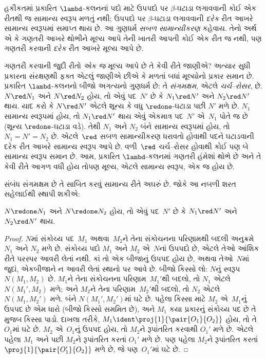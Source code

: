 હકીકતમાં પ્રકારિત $\lambd$-કલનનાં પદો માટે
ઉપપદો પર $\beta$-ઘટાડા લગાવવાની કોઈ એક
રીતથી જ સામાન્ય સ્વરૂપ મળતું નથી; ઉપપદો
પર $\beta$-ઘટાડા લગાવવાની \emph{દરેક}
રીત આખરે સામાન્ય સ્વરૂપમાં સમાપ્ત થાય છે.
આ ગુણધર્મ \emph{સબળ સામાન્યીકરણ} કહેવાય.
તેનો અર્થ એ કે ગણતરી આખરે થોભીને મૂલ્ય
આપે તેની ખાતરી આપતી કોઈ એક રીત જ નથી,
પણ ગણતરી કરવાની \emph{દરેક} રીત
આખરે મૂલ્ય આપે છે.

ગણતરી કરવાની જુદી રીતો \emph{એક જ} મૂલ્ય
આપે છે તે કેવી રીતે જાણીએ? અત્યાર સુધી
પ્રકારના સંરક્ષણથી ફક્ત એટલું જાણીએ છીએ
કે મળતાં બધાં મૂલ્યોનો પ્રકાર સમાન છે.
પ્રકારિત $\lambd$-કલનનો બીજો અગત્યનો
ગુણધર્મ છે: તે \emph{સંગમક્ષમ}, એટલે
\emph{ચર્ચ--રોસર}, છે.
$N \red N_1$ અને $N \red N_2$ હોય,
તો એવું પદ~$N'$ છે કે $N_1 \red N'$
અને $N_2 \red N'$ થાય. યાદ કરો કે
$N \red N'$ એટલે શૂન્ય કે વધુ
$\redone$-ઘટાડા પછી $N'$ મળે છે.
$N_1$ સામાન્ય સ્વરૂપમાં હોય, તો
$N_1 \red N'$ થાય એવું એકમાત્ર પદ~$N'$
એ~$N_1$ પોતે જ છે (શૂન્ય
$\redone$-ઘટાડા વડે). તેથી $N_1$ અને
$N_2$ બંને સામાન્ય સ્વરૂપમાં હોય, તો
$N_1 = N' = N_2$ છે. એટલે~$\red$
સબળ સામાન્યીકરણ ધરાવતો હોવાથી પદને
ઘટાડવાની દરેક રીત આખરે સામાન્ય સ્વરૂપ આપે છે.
વળી~$\red$ ચર્ચ--રોસર હોવાથી કોઈ પણ
બે સામાન્ય સ્વરૂપ સમાન છે. આમ, પ્રકારિત
$\lambd$-કલનમાં ગણતરી હંમેશાં થોભે છે
અને તે કેવી રીતે આગળ વધી હોય તોપણ
મૂલ્ય, એટલે સામાન્ય સ્વરૂપ, એક જ હોય છે.

સંબંધ સંગમક્ષમ છે તે સાબિત કરવું સામાન્ય રીતે
અઘરું છે. જોકે આ નબળી શરત સહેલાઈથી
સ્થાપી શકીએ:

\begin{prop}
$N \redone N_1$ અને $N \redone N_2$ હોય,
તો એવું પદ~$N'$ છે કે $N_1 \red N'$
અને $N_2 \red N'$ થાય.
\end{prop}

\begin{proof}
  $N$માં સંકોચ્ય પદ~$M_1$ અથવા~$M_2$ને
  તેના સંકોચનના પરિણામથી બદલી અનુક્રમે
  $N_1$ અને $N_2$ મળે છે. સંકોચ્ય પદો
  $M_1$ અને $M_2$ એ~$N$નાં ઉપપદો છે,
  એટલે તેઓ આંશિક રીતે પરસ્પર આવરી લેતાં નથી.
  કાં તો એક બીજાનું ઉપપદ હોય છે, અથવા
  તેઓ~$N$માં જુદાં, એકબીજાને ન આવરી લેતાં
  સ્થાનો પર આવે છે. બીજો કિસ્સો લો:
  $N$નું સ્વરૂપ $N(M_1,M_2)$ છે.
  $M_1$ને તેના સંકોચનના પરિણામ~$M_1'$થી
  બદલો, તો $N_1$ એટલે $N(M_1',M_2)$
  મળે; અને $M_2$ને તેના પરિણામ~$M_2'$થી
  બદલો, તો $N_2$ એટલે $N(M_1,M_2')$
  મળે. બંને $N(M_1',M_2')$માં ઘટે છે.
  પહેલા કિસ્સા માટે $M_2$ એ~$M_1$નું
  ઉપપદ છે એમ ધારો (બીજો કિસ્સો સમમિત છે),
  અને $M_1$ કયા પ્રકારનું સંકોચ્ય પદ છે
  તે મુજબ કિસ્સા પાડો. દાખલા તરીકે,
  $M_1 \ident \proj{1}{\pair{O_1}{O_2}}$
  હોય, તો તે $O_1$માં ઘટે છે. $M_2$
  એ~$O_1$નું ઉપપદ હોય, તો $M_2$ને
  રૂપાંતરિત કરવાથી $O_1'$ મળે છે.
  એટલે પહેલા $M_1$ અને પછી $M_2$ને
  રૂપાંતરિત કરતાં $O_1'$ મળે છે.
  પણ પહેલા $M_2$ને રૂપાંતરિત કરતાં
  $\proj{1}{\pair{O_1'}{O_2}}$ મળે છે,
  જે પણ~$O_1'$માં ઘટે છે.
\end{proof}

